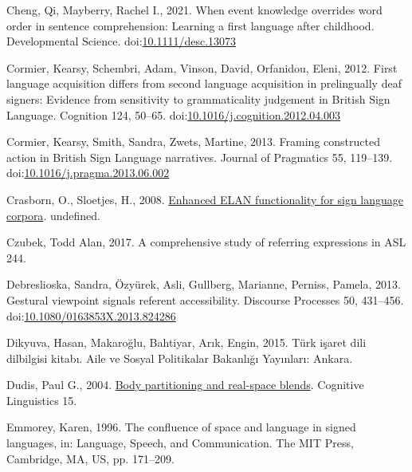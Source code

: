 \documentclass[]{elsarticle} %
\newlength{\cslhangindent}
\newenvironment{CSLReferences}[2] %
 {%
  \setlength{\parindent}{0pt}
  \ifodd #1 \everypar{\setlength{\hangindent}{\cslhangindent}}\ignorespaces\fi
  \ifnum #2 > 0
  \setlength{\parskip}{#2\baselineskip}
  \fi
 }%
 {}
\begin{document}
\begin{CSLReferences}{1}{0}
\leavevmode{}%
Cheng, Qi, Mayberry, Rachel I., 2021. When event knowledge overrides
word order in sentence comprehension: Learning a first language after
childhood. Developmental Science.
doi:\href{https://doi.org/10.1111/desc.13073}{10.1111/desc.13073}

\leavevmode{}%
Cormier, Kearsy, Schembri, Adam, Vinson, David, Orfanidou, Eleni, 2012.
First language acquisition differs from second language acquisition in
prelingually deaf signers: Evidence from sensitivity to grammaticality
judgement in British Sign Language. Cognition 124, 50--65.
doi:\href{https://doi.org/10.1016/j.cognition.2012.04.003}{10.1016/j.cognition.2012.04.003}

\leavevmode{}%
Cormier, Kearsy, Smith, Sandra, Zwets, Martine, 2013. Framing
constructed action in British Sign Language narratives. Journal of
Pragmatics 55, 119--139.
doi:\href{https://doi.org/10.1016/j.pragma.2013.06.002}{10.1016/j.pragma.2013.06.002}

\leavevmode{}%
Crasborn, O., Sloetjes, H., 2008.
\href{https://www.semanticscholar.org/paper/Enhanced-ELAN-functionality-for-sign-language-Crasborn-Sloetjes/e1623ec6b2bc3532129a3682eb263cc2e7d5389c}{Enhanced
ELAN functionality for sign language corpora}. undefined.

\leavevmode{}%
Czubek, Todd Alan, 2017. A comprehensive study of referring expressions
in ASL 244.

\leavevmode{}%
Debreslioska, Sandra, Özyürek, Asli, Gullberg, Marianne, Perniss,
Pamela, 2013. Gestural viewpoint signals referent accessibility.
Discourse Processes 50, 431--456.
doi:\href{https://doi.org/10.1080/0163853X.2013.824286}{10.1080/0163853X.2013.824286}

\leavevmode{}%
Dikyuva, Hasan, Makaroğlu, Bahtiyar, Arık, Engin, 2015. Türk i{ş}aret
dili dilbilgisi kitab{ı}. Aile ve Sosyal Politikalar Bakanl{ı}{ğ}{ı}
Yay{ı}nlar{ı}: Ankara.

\leavevmode{}%
Dudis, Paul G., 2004.
\href{https://www.degruyter.com/view/j/cogl.2004.15.issue-2/cogl.2004.009/cogl.2004.009.xml}{Body
partitioning and real-space blends}. Cognitive Linguistics 15.

\leavevmode{}%
Emmorey, Karen, 1996. The confluence of space and language in signed
languages, in: Language, Speech, and Communication. The MIT Press,
Cambridge, MA, US, pp. 171--209.


\end{CSLReferences}
\end{document}
